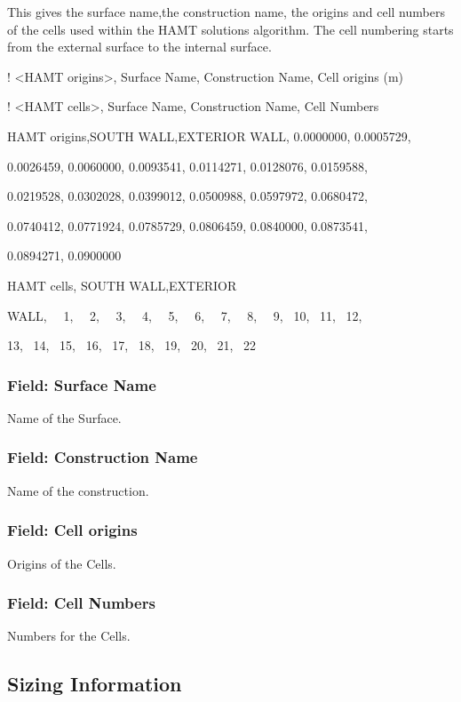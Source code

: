 This gives the surface name,the construction name, the origins and cell numbers of the cells used within the HAMT solutions algorithm. The cell numbering starts from the external surface to the internal surface.

! \textless{}HAMT origins\textgreater{}, Surface Name, Construction Name, Cell origins (m)

! \textless{}HAMT cells\textgreater{}, Surface Name, Construction Name, Cell Numbers

HAMT origins,SOUTH WALL,EXTERIOR WALL, 0.0000000, 0.0005729,

0.0026459, 0.0060000, 0.0093541, 0.0114271, 0.0128076, 0.0159588,

0.0219528, 0.0302028, 0.0399012, 0.0500988, 0.0597972, 0.0680472,

0.0740412, 0.0771924, 0.0785729, 0.0806459, 0.0840000, 0.0873541,

0.0894271, 0.0900000

HAMT cells, SOUTH WALL,EXTERIOR

WALL,~~ 1,~~ 2,~~ 3,~~ 4,~~ 5,~~ 6,~~ 7,~~ 8,~~ 9,~ 10,~ 11,~ 12,

13,~ 14,~ 15,~ 16,~ 17,~ 18,~ 19,~ 20,~ 21,~ 22

\subsubsection{Field: Surface Name}\label{field-surface-name-1}

Name of the Surface.

\subsubsection{Field: Construction Name}\label{field-construction-name-3}

Name of the construction.

\subsubsection{Field: Cell origins}\label{field-cell-origins}

Origins of the Cells.

\subsubsection{Field: Cell Numbers}\label{field-cell-numbers}

Numbers for the Cells.

\subsection{Sizing Information}\label{sizing-information}

